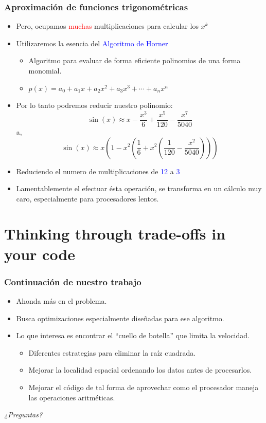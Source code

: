 \documentclass{beamer}
\begin{document}
\frame
{
\frametitle{Aproximación de funciones trigonométricas}
	\small
	\begin{itemize}
		\item<1->Pero, ocupamos \textcolor{red}{muchas} multiplicaciones para calcular los $x^k$
		\item<2->Utilizaremos la esencia del \textcolor{blue}{Algoritmo de Horner}
		\begin{itemize}
			\item<3-> Algoritmo para evaluar de forma eficiente polinomios de una forma monomial.
			\item<3-> \scriptsize $ p(x) = a_0 + a_1 x + a_2 x^2 + a_3 x^3 + \cdots + a_n x^n $
		\end{itemize}
		\item<4->Por lo tanto podremos reducir nuestro polinomio:
			$$\operatorname{sin}(x) \approx x - \frac{x^3}{6} + \frac{x^5}{120} - \frac{x^7}{5040}$$
			a,
			$$\operatorname{sin}(x) \approx x \left( 1 - x^{2}\left(\frac{1}{6} + x^{2}\left(\frac{1}{120} - \frac{x^2}{5040}\right)\right)\right)$$
		\item<5->Reduciendo el numero de multiplicaciones de \textcolor{blue}{12} a \textcolor{blue}{3}
		\item<6->Lamentablemente el efectuar ésta operación, se transforma en un cálculo muy caro, especialmente para procesadores lentos.
	\end{itemize}
	
}

\section{Thinking through trade-offs in your code}
\frame
{
\frametitle{Continuación de nuestro trabajo}

\begin{itemize}
	\item Ahonda más en el problema.
	\item Busca optimizaciones especialmente diseñadas para ese algoritmo.
	\item<1-> Lo que interesa es encontrar el ``cuello de botella'' que limita la velocidad.
	\begin{itemize}
		\item<2-> Diferentes estrategias para eliminar la raíz cuadrada.
		\item<3-> Mejorar la localidad espacial ordenando los datos antes de procesarlos.
		\item<4-> Mejorar el código de tal forma de aprovechar como el procesador maneja las
operaciones aritméticas.
	\end{itemize}
\end{itemize}


}


\frame
{
\begin{center}
\begin{Huge}\textit{¿Preguntas?}\end{Huge}
\end{center}
}
\end{document}
